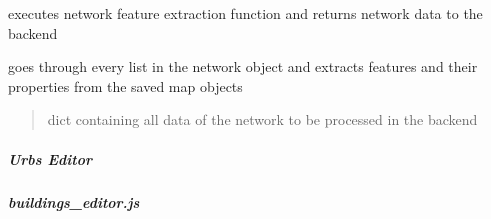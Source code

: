 \documentclass[letterpaper,10pt,english]{sphinxmanual}
\begin{document}
\begin{fulllineitems}
\label{\detokenize{docs_gui/js_api/network_editor/collect_returnable_network_features:returnEditedNet}}
\pysigstartsignatures
{}
\pysigstopsignatures
\sphinxAtStartPar
executes network feature extraction function and returns network data to the backend

\end{fulllineitems}


\begin{fulllineitems}
\label{\detokenize{docs_gui/js_api/network_editor/collect_returnable_network_features:extractNetworFeatures}}
\pysigstartsignatures
{}
\pysigstopsignatures
\sphinxAtStartPar
goes through every list in the network object and extracts features and their properties from the saved map objects
\begin{quote}\begin{description}
\sphinxAtStartPar
dict containing all data of the network to be processed in the backend

\end{description}\end{quote}

\end{fulllineitems}


\sphinxstepscope


\subparagraph{Urbs Editor}
\label{\detokenize{docs_gui/js_api/urbs_editor/index:urbs-editor}}\label{\detokenize{docs_gui/js_api/urbs_editor/index::doc}}
\sphinxstepscope


\subparagraph{buildings\_editor.js}
\label{\detokenize{docs_gui/js_api/urbs_editor/buildings_editor:buildings-editor-js}}\label{\detokenize{docs_gui/js_api/urbs_editor/buildings_editor::doc}}
\end{document}
